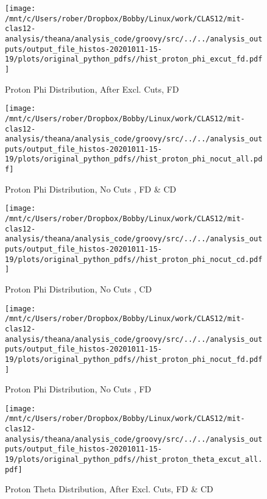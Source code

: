 \documentclass{article}
\begin{document}
\begin{landscape}
    \begin{figure}[h]
        \centering

        \texttt{[image: /mnt/c/Users/rober/Dropbox/Bobby/Linux/work/CLAS12/mit-clas12-analysis/theana/analysis\_code/groovy/src/../../analysis\_outputs/output\_file\_histos-20201011-15-19/plots/original\_python\_pdfs//hist\_proton\_phi\_excut\_fd.pdf]}
        \captionsetup{textformat=empty,labelformat=blank}
        \caption{Proton Phi Distribution, After Excl. Cuts, FD}
    \end{figure}
    \clearpage
    
    \begin{figure}[h]
        \centering

        \texttt{[image: /mnt/c/Users/rober/Dropbox/Bobby/Linux/work/CLAS12/mit-clas12-analysis/theana/analysis\_code/groovy/src/../../analysis\_outputs/output\_file\_histos-20201011-15-19/plots/original\_python\_pdfs//hist\_proton\_phi\_nocut\_all.pdf]}
        \captionsetup{textformat=empty,labelformat=blank}
        \caption{Proton Phi Distribution, No Cuts , FD \& CD}
    \end{figure}
    \clearpage
    
    \begin{figure}[h]
        \centering

        \texttt{[image: /mnt/c/Users/rober/Dropbox/Bobby/Linux/work/CLAS12/mit-clas12-analysis/theana/analysis\_code/groovy/src/../../analysis\_outputs/output\_file\_histos-20201011-15-19/plots/original\_python\_pdfs//hist\_proton\_phi\_nocut\_cd.pdf]}
        \captionsetup{textformat=empty,labelformat=blank}
        \caption{Proton Phi Distribution, No Cuts , CD}
    \end{figure}
    \clearpage
    
    \begin{figure}[h]
        \centering

        \texttt{[image: /mnt/c/Users/rober/Dropbox/Bobby/Linux/work/CLAS12/mit-clas12-analysis/theana/analysis\_code/groovy/src/../../analysis\_outputs/output\_file\_histos-20201011-15-19/plots/original\_python\_pdfs//hist\_proton\_phi\_nocut\_fd.pdf]}
        \captionsetup{textformat=empty,labelformat=blank}
        \caption{Proton Phi Distribution, No Cuts , FD}
    \end{figure}
    \clearpage
    
    \begin{figure}[h]
        \centering

        \texttt{[image: /mnt/c/Users/rober/Dropbox/Bobby/Linux/work/CLAS12/mit-clas12-analysis/theana/analysis\_code/groovy/src/../../analysis\_outputs/output\_file\_histos-20201011-15-19/plots/original\_python\_pdfs//hist\_proton\_theta\_excut\_all.pdf]}
        \captionsetup{textformat=empty,labelformat=blank}
        \caption{Proton Theta Distribution, After Excl. Cuts, FD \& CD}
    \end{figure}
    \clearpage
    

\end{landscape}
\end{document}
